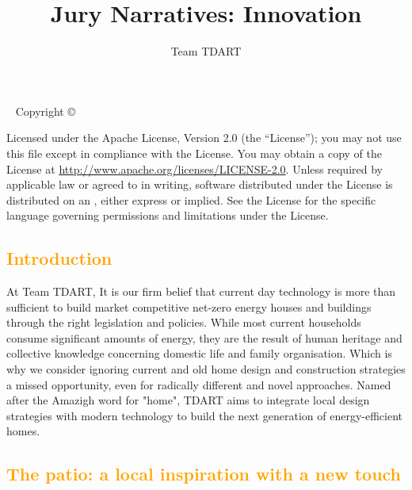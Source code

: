 \documentclass[justified]{tufte-book}
\author{Team TDART\hfill \usebox{\titleimage}}
\title[Jury Narratives]{Jury Narratives: Innovation}
\newcommand{\monthyear}{%
	\ifcase\month\or January\or February\or March\or April\or May\or June\or
	July\or August\or September\or October\or November\or
	December\fi\space\number\year
}
\begin{document}
	\frontmatter
	\maketitle
	\newpage
	\begin{fullwidth}
		~\vfill
		\thispagestyle{empty}
		\setlength{\parindent}{0pt}
		\setlength{\parskip}{\baselineskip}
		Copyright \copyright\ \the\year\ \thanklessauthor
		
		\par{}
		
		
		\par Licensed under the Apache License, Version 2.0 (the ``License''); you may not
		use this file except in compliance with the License. You may obtain a copy
		of the License at \url{http://www.apache.org/licenses/LICENSE-2.0}. Unless
		required by applicable law or agreed to in writing, software distributed
		under the License is distributed on an , either express or implied. See the
		License for the specific language governing permissions and limitations
		under the License.
		
	\end{fullwidth}
	
	
	\textcolor{orange}{\chapter*{Introduction}}
	At Team TDART, It is our firm belief that current day technology is more than sufficient to build market competitive net-zero energy houses and buildings through the right legislation and policies. While most current households consume significant amounts of energy, they are the result of human heritage and collective knowledge concerning domestic life and family organisation. Which is why we consider ignoring current and old home design and construction strategies a missed opportunity, even for radically different and novel approaches. Named after the Amazigh word for "home", TDART aims to integrate local design strategies with modern technology to build the next generation of energy-efficient homes.
	
	\textcolor{orange}{\chapter{The patio: a local inspiration with a new touch}}
	\label{ch:patio}
	
\end{document}

